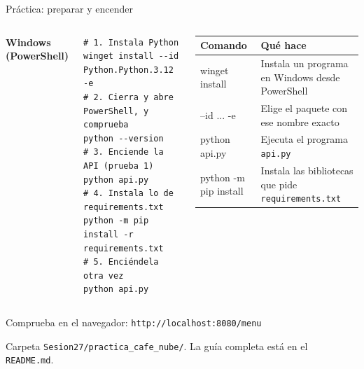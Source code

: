 \documentclass[aspectratio=169,10pt,c]{beamer}
\begin{document}
\begin{frame}[fragile]{Práctica: preparar y encender}
\begin{columns}[T,onlytextwidth]
{\small\bfseries Windows (PowerShell)}
\begin{lstlisting}
# 1. Instala Python
winget install --id Python.Python.3.12 -e
# 2. Cierra y abre PowerShell, y comprueba
python --version
# 3. Enciende la API (prueba 1)
python api.py
# 4. Instala lo de requirements.txt
python -m pip install -r requirements.txt
# 5. Enciéndela otra vez
python api.py
\end{lstlisting}
\renewcommand{\arraystretch}{1.25}
\scriptsize
\begin{tabular}{@{}>{\ttfamily}l>{\raggedright\arraybackslash}p{2.35cm}@{}}
\toprule
\textsf{\textbf{Comando}} & \textbf{Qué hace}\\
\midrule
winget install & Instala un programa en Windows desde PowerShell\\
--id ... -e & Elige el paquete con ese nombre exacto\\
python api.py & Ejecuta el programa \texttt{api.py}\\
python -m pip install & Instala las bibliotecas que pide \texttt{requirements.txt}\\
\bottomrule
\end{tabular}
\end{columns}
\par\vspace{3mm}
\begin{exampleblock}{Comprueba en el navegador: \texttt{http://localhost:8080/menu}}
\scriptsize{}
\end{exampleblock}
\par\vspace{2mm}
{\footnotesize\color{utpGris} Carpeta \texttt{Sesion27/practica\_cafe\_nube/}. La guía completa está en el \texttt{README.md}.}
\end{frame}
\end{document}
